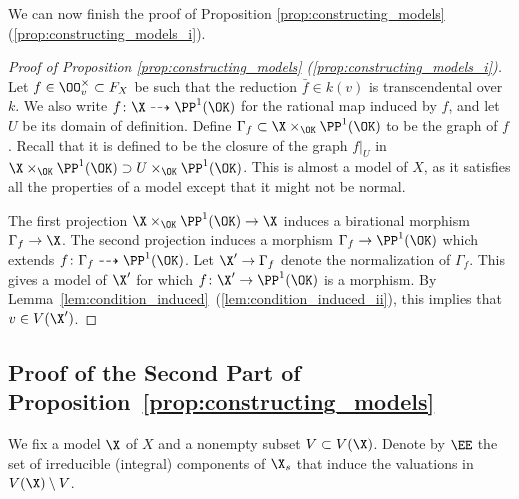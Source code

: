 We can now finish the proof of Proposition \ref{prop:constructing_models} (\ref{prop:constructing_models_i}).

\begin{proof}[Proof of Proposition \ref{prop:constructing_models} (\ref{prop:constructing_models_i})]
    Let $f \in \OO_v^\times \subset F_X$ be such that the reduction $\bar{f} \in k(v)$ is transcendental over $k$.
    We also write $f \colon \X \dashrightarrow \PP^1(\OK )$ for the rational map induced by $f$, and let $U$ be its domain of definition.
    Define $\Gamma_f \subset \X \times_{\OK } \PP^1(\OK )$ to be the graph of $f$.
    Recall that it is defined to be the closure of the graph $f|_U$ in $\X \times_{\OK } \PP^1(\OK ) \supset U \times_{\OK } \PP^1(\OK )$.
    This is almost a model of $X$, as it satisfies all the properties of a model except that it might not be normal.
    \begin{center}
    \end{center}
    The first projection $\X \times_{\OK } \PP^1(\OK ) \to \X$ induces a birational morphism $\Gamma_f \to \X$.
    The second projection induces a morphism $\Gamma_f \to \PP^1(\OK )$ which extends $f \colon \Gamma_f \dashrightarrow \PP^1(\OK )$.
    Let $\X' \to \Gamma_f$ denote the normalization of $\Gamma_f$.
    This gives a model of $\X'$ for which $f \colon \X' \to \PP^1(\OK )$ is a morphism.
    By Lemma~\ref{lem:condition_induced}~(\ref{lem:condition_induced_ii}), this implies that $v \in V(\X')$.
\end{proof}


\subsection{Proof of the Second Part of Proposition~\ref{prop:constructing_models}}\label{subsec:proof-of-the-second-part}
We fix a model $\X$ of $X$ and a nonempty subset $V \subset V(\X)$.
Denote by $\EE$ the set of irreducible (integral) components of $\X_s$ that induce the valuations in $V(\X)\setminus V$.

